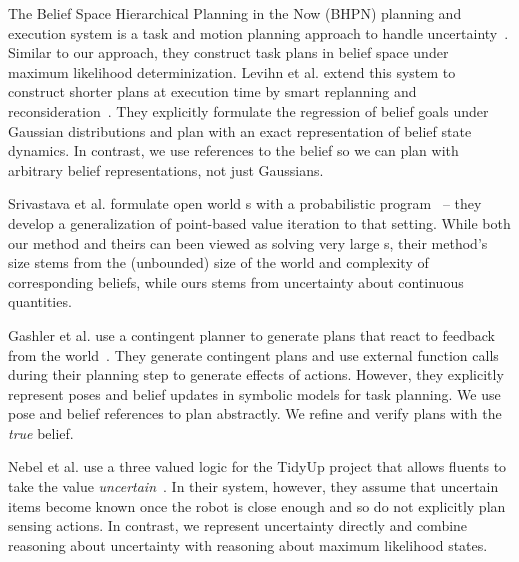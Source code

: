 
The Belief Space Hierarchical Planning in the Now (BHPN) planning and execution system is a task and motion planning
approach to handle uncertainty~\cite{kaelbling2013integrated}. Similar
to our approach, they construct task plans in belief space under
maximum likelihood determinization. Levihn et al. extend this system
to construct shorter plans at execution time by smart replanning and
reconsideration~\cite{levihn2013foresight}. They explicitly formulate
the regression of belief goals under Gaussian distributions and plan
with an exact representation of belief state dynamics. In contrast, we
use references to the belief so we can plan with arbitrary belief
representations, not just Gaussians.

Srivastava et al. formulate open world \pomdp s with a probabilistic
program~\cite{srivastava2014first} -- they develop a generalization of
point-based value iteration to that setting. While both our method and
theirs can been viewed as solving very large \pomdp s, their method's size stems from
the (unbounded) size of the world and complexity of corresponding
beliefs, while ours stems from uncertainty about continuous quantities.


Gashler et al. use a contingent planner to generate plans that react
to feedback from the world~\cite{gaschler2013kvp}. They generate
contingent plans and use external function calls during their planning
step to generate effects of actions. However, they explicitly
represent poses and belief updates in symbolic models for task
planning. We use pose and belief references to plan abstractly. We
refine and verify plans with the \emph{true} belief.

Nebel et al. use a three valued logic for the TidyUp project that
allows fluents to take the value
\emph{uncertain}~\cite{nebel13aaaiirs}. In their system, however, they
assume that uncertain items become known once the robot is close
enough and so do not explicitly plan sensing actions. In contrast, we
represent uncertainty directly and combine
reasoning about uncertainty with reasoning about maximum likelihood
states.


